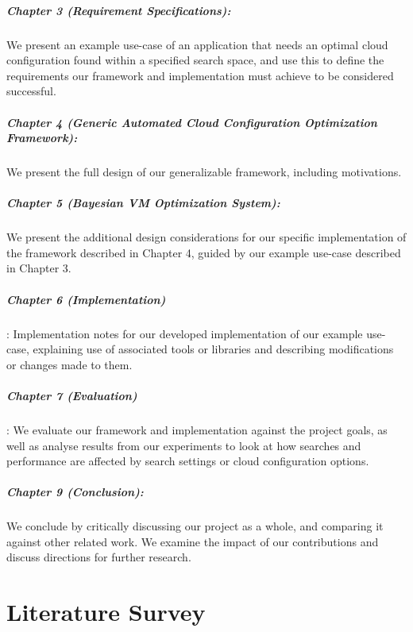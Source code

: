 \documentclass{report}
\begin{document}
\paragraph{Chapter 3 (Requirement Specifications):} We present an example use-case of an application that needs an optimal cloud configuration found within a specified search space, and use this to define the requirements our framework and implementation must achieve to be considered successful.
\paragraph{Chapter 4 (Generic Automated Cloud Configuration Optimization Framework):} We present the full design of our generalizable framework, including motivations.
\paragraph{Chapter 5 (Bayesian VM Optimization System):} We present the additional design considerations for our specific implementation of the framework described in Chapter 4, guided by our example use-case described in Chapter 3.
\paragraph{Chapter 6 (Implementation)}: Implementation notes for our developed implementation of our example use-case, explaining use of associated tools or libraries and describing modifications or changes made to them.
\paragraph{Chapter 7 (Evaluation)}: We evaluate our framework and implementation against the project goals, as well as analyse results from our experiments to look at how searches and performance are affected by search settings or cloud configuration options.
\paragraph{Chapter 9 (Conclusion):} We conclude by critically discussing our project as a whole, and comparing it against other related work. We examine the impact of our contributions and discuss directions for further research.

\chapter{Literature Survey}
\end{document}
